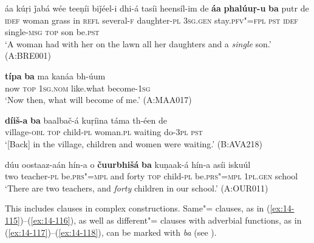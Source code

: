 \begin{exe}
\ex
\label{ex:14-111}
\gll áa kúṛi ǰabá wée teeṇíi biǰéel-i dhi-á  tasíi heensíl-im de \textbf{áa} \textbf{phalúuṛ-u} \textbf{ba} putr de\\
\textsc{idef} woman grass in \textsc{refl} several-\textsc{f} daughter-\textsc{pl} \textsc{3sg.gen} stay.\textsc{pfv"=fpl} \textsc{pst} \textsc{idef} single-\textsc{msg} \textsc{top} son be.\textsc{pst}\\
\glt `A woman had with her on the lawn all her daughters and a \textit{single} son.' (A:BRE001)

\ex
\label{ex:14-112}
\gll \textbf{típa} \textbf{ba} ma kanáa bh-úum \\
now \textsc{top} \textsc{1sg.nom} like.what become-\textsc{1sg } \\
\glt `Now then, what will become of me.' (A:MAA017)

\ex
\label{ex:14-113}
\gll \textbf{díiš-a} \textbf{ba} baalbač-á kuṛíina táma  th-éen de \\
village-\textsc{obl} \textsc{top} child-\textsc{pl} woman.\textsc{pl} waiting do-\textsc{3pl} \textsc{pst } \\
\glt `[Back] in the village, children and women were waiting.' (B:AVA218)

\ex
\label{ex:14-114}
\gll dúu oostaaz-aán hín-a o \textbf{čuurbhišá} \textbf{ ba} kuṇaak-á hín-a asíi iskuúl \\
two teacher-\textsc{pl} be.\textsc{prs"=mpl} and forty  \textsc{top} child-\textsc{pl} be.\textsc{prs"=mpl} \textsc{1pl.gen} school  \\
\glt `There are two teachers, and \textit{forty} children in our school.' (A:OUR011)
\end{exe}

This includes clauses in complex constructions. Same"= clauses, as in (\ref{ex:14-115})--(\ref{ex:14-116}), as well as different"= clauses with adverbial functions, as in (\ref{ex:14-117})--(\ref{ex:14-118}), can be marked with \textit{ba} (see ).

